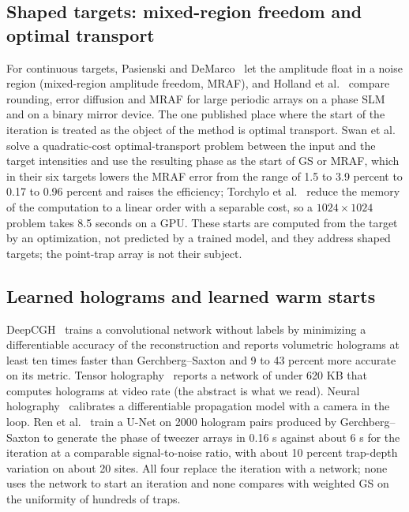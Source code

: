 \subsection{Shaped targets: mixed-region freedom and optimal transport}\label{sec:rel-shape}

For continuous targets, Pasienski and DeMarco~\cite{pasienski} let the amplitude float in a noise region (mixed-region amplitude freedom, MRAF), and Holland et al.~\cite{holland} compare rounding, error diffusion and MRAF for large periodic arrays on a phase SLM and on a binary mirror device. The one published place where the start of the iteration
is treated as the object of the method is optimal transport. Swan et al.~\cite{swan} solve a quadratic-cost optimal-transport problem between the input and the target intensities and use the resulting phase as the start of GS or MRAF, which in their six targets lowers the MRAF error from the range of 1.5 to 3.9 percent to 0.17 to 0.96 percent
and raises the efficiency; Torchylo et al.~\cite{torchylo} reduce the memory of the computation to a linear order with a separable cost, so a $1024\times1024$ problem takes 8.5 seconds on a GPU. These starts are computed from the target by an optimization, not predicted by a trained model, and they address shaped targets; the point-trap array is not their subject.

\subsection{Learned holograms and learned warm starts}\label{sec:rel-learned}

DeepCGH~\cite{eybposh} trains a convolutional network without labels by minimizing a differentiable accuracy of the reconstruction and reports volumetric holograms at least ten times faster than Gerchberg--Saxton and 9 to 43 percent more accurate on its metric. Tensor holography~\cite{shi}
reports a network of under 620 KB that computes holograms at video rate (the abstract is what we read). Neural holography~\cite{peng} calibrates a differentiable propagation model with a camera in the loop. Ren et al.~\cite{ren} train a U-Net on 2000 hologram pairs produced by Gerchberg--Saxton to generate the phase of tweezer arrays in 0.16 s against about 6 s for the iteration at a
comparable signal-to-noise ratio, with about 10 percent trap-depth variation on about 20 sites. All four replace the iteration with a network; none uses the network to start an iteration and none compares with weighted GS on the uniformity of hundreds of traps.


